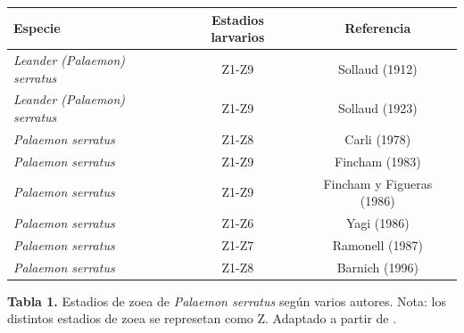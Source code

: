\documentclass[a4paper]{article}
\begin{document}
\begin{adjustbox}{max width=\textwidth}
\begin{tabular}{|l|c|c|}
\hline 
Especie & Estadios larvarios & Referencia\\
\hline
\textit{Leander (Palaemon) serratus} & Z1-Z9 & Sollaud (1912)\\
\hline
\textit{Leander (Palaemon) serratus} & Z1-Z9 & Sollaud (1923)\\
\hline
\textit{Palaemon serratus} & Z1-Z8 & Carli (1978)\\
\hline
\textit{Palaemon serratus} & Z1-Z9 & Fincham (1983)\\
\hline
\textit{Palaemon serratus} & Z1-Z9 & Fincham y Figueras (1986)\\
\hline
\textit{Palaemon serratus} & Z1-Z6 & Yagi (1986)\\
\hline
\textit{Palaemon serratus} & Z1-Z7 & Ramonell (1987)\\
\hline
\textit{Palaemon serratus} & Z1-Z8 & Barnich (1996)\\
\hline
\end{tabular}
\end{adjustbox}

\textbf{Tabla 1.} Estadios de zoea de \textit{Palaemon serratus} según varios autores. Nota: los distintos estadios de zoea se represetan como Z. Adaptado a partir de \citep{Gonzalez2001}.\par
\end{document}
